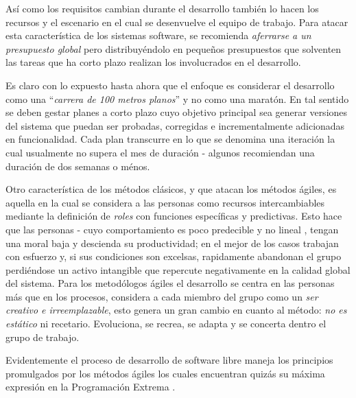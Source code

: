 Así como los requisitos cambian durante el desarrollo también lo hacen los recursos y el escenario en el cual se desenvuelve el equipo de trabajo. Para atacar esta característica de los sistemas software, se recomienda \textit{aferrarse a un presupuesto global} pero distribuyéndolo en pequeños presupuestos que solventen las tareas que ha corto plazo realizan los involucrados en el desarrollo.

Es claro con lo expuesto hasta ahora que el enfoque es considerar el desarrollo como una “\textit{carrera de 100 metros planos}” y no como una maratón. En tal sentido se deben gestar planes a corto plazo cuyo objetivo principal sea generar versiones del sistema que puedan ser probadas, corregidas e incrementalmente adicionadas en funcionalidad. Cada plan transcurre en lo que se denomina una iteración la cual usualmente no supera el mes de duración - algunos recomiendan una duración de dos semanas o ménos.\cite{beck1999}

Otro característica de los métodos clásicos, y que atacan los métodos ágiles, es aquella en la cual se considera a las personas como recursos intercambiables mediante la definición de \textit{roles} con funciones específicas y predictivas. Esto hace que las personas - cuyo comportamiento es poco predecible y no lineal \cite{cockburn1999}, tengan una moral baja y descienda su productividad; en el mejor de los casos trabajan con esfuerzo y, si sus condiciones son excelsas, rapidamente abandonan el grupo perdiéndose un activo intangible que repercute negativamente en la calidad global del sistema. Para los metodólogos ágiles el desarrollo se centra en las personas más que en los procesos, considera a cada miembro del grupo como un \textit{ser creativo e irreemplazable}, esto genera un gran cambio en cuanto al método: \textit{no es estático} ni recetario. Evoluciona, se recrea, se adapta y se concerta dentro el grupo de trabajo.

Evidentemente el proceso de desarrollo de software libre maneja los principios promulgados por los métodos ágiles los cuales encuentran quizás su máxima expresión en la Programación Extrema \cite{beck1999}.


